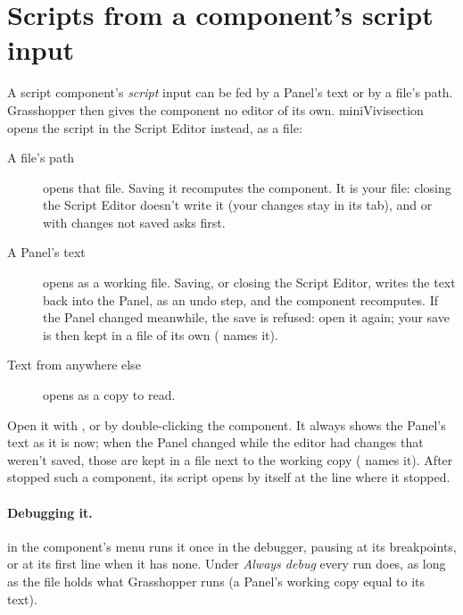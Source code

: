 
\section{Scripts from a component's script input}\label{sec:scriptinput}

A script component's \emph{script} input can be fed by a Panel's text or by a file's path. Grasshopper then gives the
component no editor of its own. miniVivisection opens the script in the Script Editor instead, as a file:

\begin{description}
  \item[A file's path] opens that file. Saving it recomputes the component. It is your file: closing the Script Editor
        doesn't write it (your changes stay in its tab), and  or  with changes not saved asks first.
  \item[A Panel's text] opens as a working file. Saving, or closing the Script Editor, writes the text back into the Panel,
        as an undo step, and the component recomputes. If the Panel changed meanwhile, the save is refused: open it again;
        your save is then kept in a file of its own ( names it).
  \item[Text from anywhere else] opens as a copy to read.
\end{description}

Open it with , or by double-clicking the
component. It always shows the Panel's text as it is now; when the Panel changed while the editor had changes that weren't
saved, those are kept in a file next to the working copy ( names it). After  stopped such a
component, its script opens by itself at the line where it stopped.

\paragraph{Debugging it.}  in the component's menu runs it once in the debugger, pausing at
its breakpoints, or at its first line when it has none. Under \emph{Always debug} every run does, as long as the
file holds what Grasshopper runs (a Panel's working copy equal to its text).

